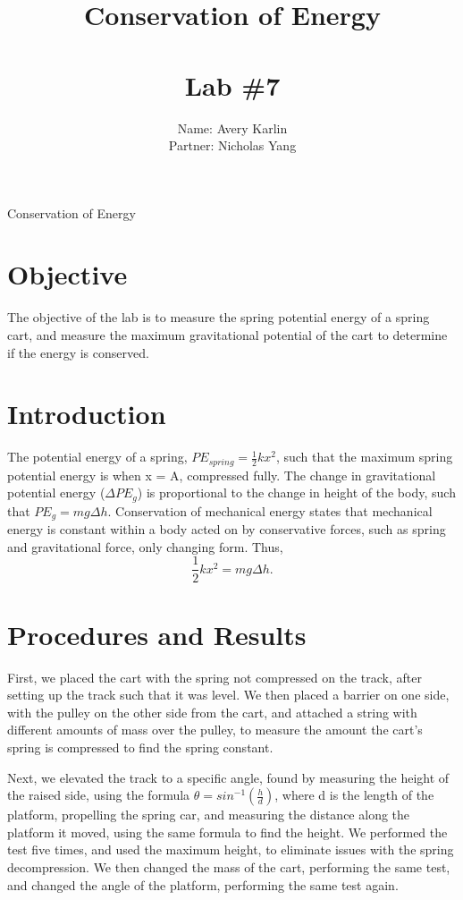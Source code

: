 \documentclass[11pt, titlepage]{article}
\title{Conservation of Energy\\ \ \\ \large Lab \#7}
\author{Name: Avery Karlin \\ Partner: Nicholas Yang}
\date{}
\begin{document}
\maketitle

\begin{center}
\LARGE Conservation of Energy
\end{center}

\section*{Objective}
The objective of the lab is to measure the spring potential energy of a spring cart, and measure the maximum gravitational potential of the cart to determine if the energy is conserved.

\section*{Introduction}
The potential energy of a spring, $PE_{spring} = \frac{1}{2}kx^2$, such that the maximum spring potential energy is when x = A, compressed fully. The change in gravitational potential energy ($\Delta PE_{g}$) is proportional to the change in height of the body, such that $PE_{g} = mg\Delta h$. Conservation of mechanical energy states that mechanical energy is constant within a body acted on by conservative forces, such as spring and gravitational force, only changing form. Thus, $$\frac{1}{2}kx^2 = mg\Delta h.$$

\section*{Procedures and Results}
First, we placed the cart with the spring not compressed on the track, after setting up the track such that it was level. We then placed a barrier on one side, with the pulley on the other side from the cart, and attached a string with different amounts of mass over the pulley, to measure the amount the cart's spring is compressed to find the spring constant.

Next, we elevated the track to a specific angle, found by measuring the height of the raised side, using the formula $\theta = sin^{-1}(\frac{h}{d})$, where d is the length of the platform, propelling the spring car, and measuring the distance along the platform it moved, using the same formula to find the height. We performed the test five times, and used the maximum height, to eliminate issues with the spring decompression. We then changed the mass of the cart, performing the same test, and changed the angle of the platform, performing the same test again.
\end{document}
